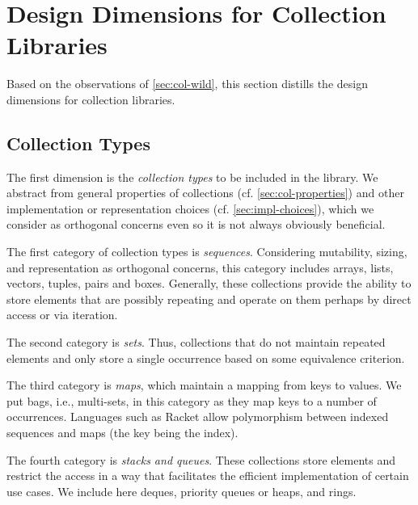 \documentclass[sigconf, 10pt]{acmart}
\begin{document}
\section{Design Dimensions for Collection Libraries}
\label{sec:dimensions}

Based on the observations of \cref{sec:col-wild},
this section distills the design dimensions for collection libraries. 

\subsection{Collection Types}
\label{sec:col-types}

The first dimension is the \emph{collection types} to be included in the library.
We abstract %
from general properties of collections (cf. \cref{sec:col-properties})
and other implementation or representation choices
(cf. \cref{sec:impl-choices}),
which we consider as orthogonal concerns
even so it is not always obviously beneficial.

The first category of collection types is \emph{sequences}.
Considering mutability, sizing, and representation
as orthogonal concerns,
this category includes arrays, lists, vectors, tuples, pairs and boxes.
Generally, these collections provide the ability to store elements
that are possibly repeating
and operate on them perhaps by direct access or via iteration.

The second category is \emph{sets}.
Thus, collections that do not maintain repeated elements
and only store a single occurrence based on some equivalence criterion.

The third category is \emph{maps}, which maintain a mapping from keys to values.
We put bags, i.e., multi-sets, in this category as they map keys to a number of occurrences.
Languages such as Racket allow polymorphism between indexed sequences and maps (the key being the index).

The fourth category is \emph{stacks and queues}.
These collections store elements
and restrict the access in a way
that facilitates the efficient implementation of certain use cases.
We include here deques, priority queues or heaps, and rings.
\end{document}
